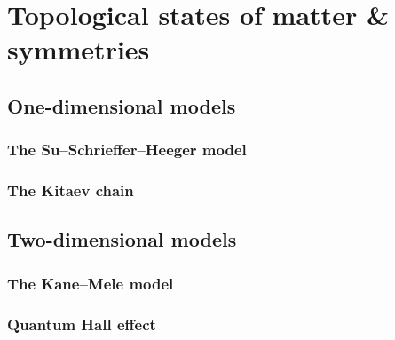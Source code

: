 \chapter[Topological states of matter]{Topological states of matter \& symmetries}


\section{One-dimensional models}

\subsection{The Su--Schrieffer--Heeger model}

\subsection{The Kitaev chain}


\section{Two-dimensional models}

\subsection{The Kane--Mele model}

\subsection{Quantum Hall effect}